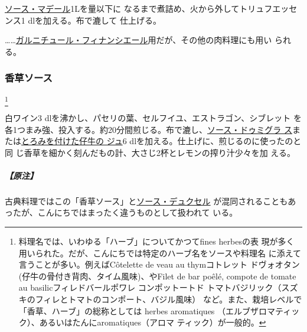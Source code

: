 \begin{recette}
\protect\hyperlink{sauce-madere}{ソース・マデール}1\unquart{}Lを\troisquarts{}量以下に
なるまで煮詰め、火から外してトリュフエッセンス1 dlを加える。布で漉して
仕上げる。

\ldots{}\ldots{}\protect\hyperlink{garniture-financiere}{ガルニチュール・フィナンシエール}用だが、その他の肉料理にも用い
られる。

\hypertarget{sauce-aux-fines-herbes}{%
\subsubsection{香草ソース}\label{sauce-aux-fines-herbes}}

\footnote{料理名では、いわゆる「ハーブ」についてかつてfines
  herbesの表
  現が多く用いられた。だが、こんにちでは特定のハーブ名をソースや料理名
  に添えて言うことが多い。例えばCôtelette de veau au thymコトレット
  ドヴォオタン(仔牛の骨付き背肉、タイム風味)、やFilet de bar poêlé,
  compote de tomate au basilicフィレドバールポワレ コンポットートド
  トマトバジリック（スズキのフィレとトマトのコンポート、バジル風味）
  など。また、栽培レベルで「香草、ハーブ」の総称としては herbes
  aromatiques
  （エルブザロマティック）、あるいはたんにaromatiques（アロマ
  ティック）が一般的。}

 

白ワイン3 dlを沸かし、パセリの葉、セルフイユ、エストラゴン、シブレット
を各1つまみ強、投入する。約20分間煎じる。布で漉し、\protect\hyperlink{sauce-demi-glace}{ソース・ドゥミグラ
ス}または\protect\hyperlink{jus-de-veau-lie}{とろみを付けた仔牛の ジュ}6
dlを加える。仕上げに、煎じるのに使ったのと同
じ香草を細かく刻んだもの計、大さじ2\undemi{}杯とレモンの搾り汁少々を加
える。

\hypertarget{nota-sauce-aux-fines-herbes}{%
\subparagraph{【原注】}\label{nota-sauce-aux-fines-herbes}}

古典料理ではこの「香草ソース」と\protect\hyperlink{sauce-duxelles}{ソース・デュクセル}
が混同されることもあったが、こんにちではまったく違うものとして扱われて
いる。


\end{recette}
